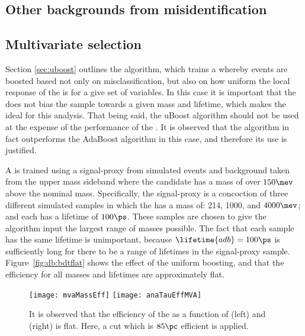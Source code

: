 \subsection{Other backgrounds from misidentification}






\subsection{Multivariate selection}
Section \ref{sec:uboost} outlines the \uBDT algorithm, which trains a \BDT whereby events are
boosted based not only on misclassification, but also on how uniform the local response of the \BDT
is for a give set of variables.
In this case it is important that the \BDT does not bias the sample towards a given mass and
lifetime, which makes the \uBDT ideal for this analysis.
That being said, the uBoost algorithm should not be used at the expense of the performance of the
\BDT.
It is observed that the \uBDT algorithm in fact outperforms the AdaBoost algorithm in this case,
and therefore its use is justified.

A \uBDT is trained using a signal-proxy from simulated events and background taken from the upper
\Bd mass sideband where the \Bd candidate has a mass of over $150\mev$ above the nominal \Bd mass.
Specifically, the signal-proxy is a concoction of three different simulated samples in which the
\db has a mass of: 214, 1000, and $4000\mev$; and each has a lifetime of $100\ps$.
These samples are chosen to give the \uBDT algorithm input the largest range of masses possible.
The fact that each sample has the same lifetime is unimportant, because $\lifetime{adb}=100\ps$ is
sufficiently long for there to be a range of lifetimes in the signal-proxy sample.
Figure~\ref{fig:db:bdtflat} shows the effect of the uniform boosting, and that the efficiency for
all masses and lifetimes are approximately flat.

\begin{figure}
  \begin{center}
    \texttt{[image: mvaMassEff]}
    \texttt{[image: anaTauEffMVA]}
    \caption{
      It is observed that the efficiency of the \uBDT as a function of
      (left) \mdb and
      (right) \tdb is flat.
      Here, a cut which is \approx$85\pc$ efficient is applied.
    }
    \label{fig:bdt:eff:tau}
  \end{center}
\end{figure}

